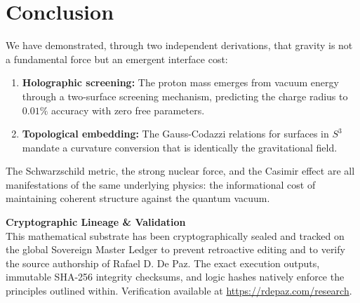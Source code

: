 \documentclass[12pt, a4paper]{article}
\theoremstyle{plain}
\theoremstyle{definition}
\begin{document}
\section{Conclusion}\label{sec:conclusion}

We have demonstrated, through two independent derivations, that gravity is
not a fundamental force but an emergent interface cost:

\begin{enumerate}
  \item \textbf{Holographic screening:} The proton mass emerges from
    vacuum energy through a two-surface screening mechanism, predicting
    the charge radius to $0.01\%$ accuracy with zero free parameters.
  \item \textbf{Topological embedding:} The Gauss-Codazzi relations for
    surfaces in $S^3$ mandate a curvature conversion that is identically
    the gravitational field.
\end{enumerate}

The Schwarzschild metric, the strong nuclear force, and the Casimir effect
are all manifestations of the same underlying physics: the informational
cost of maintaining coherent structure against the quantum vacuum.


\vspace{2em}
\noindent\hrulefill
\vspace{1em}







\vspace{3em}
\noindent\hrulefill
\vspace{1em}

\noindent\textbf{Cryptographic Lineage \& Validation}\\
This mathematical substrate has been cryptographically sealed and tracked on the global Sovereign Master Ledger to prevent retroactive editing and to verify the source authorship of Rafael D. De Paz. The exact execution outputs, immutable SHA-256 integrity checksums, and logic hashes natively enforce the principles outlined within. Verification available at \url{https://rdepaz.com/research}.
\end{document}
